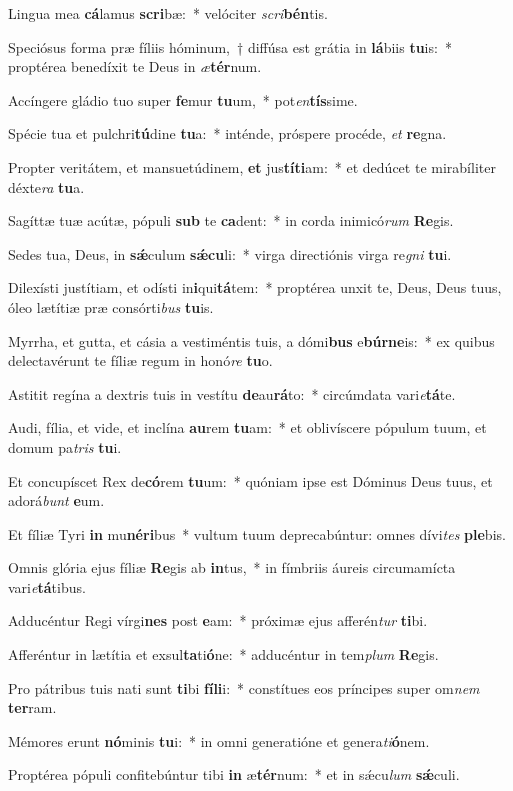 \item Lingua mea \textbf{cá}lamus \textbf{scri}bæ:~* velóciter \textit{scri}\textbf{bén}tis.
\item Speciósus forma præ fíliis hóminum,~† diffúsa est grátia in \textbf{lá}biis \textbf{tu}is:~* proptérea benedíxit te Deus in \textit{æ}\textbf{tér}num.
\item Accíngere gládio tuo super \textbf{fe}mur \textbf{tu}um,~* pot\textit{en}\textbf{tís}sime.
\item Spécie tua et pulchri\textbf{tú}dine \textbf{tu}a:~* inténde, próspere procéde, \textit{et} \textbf{re}gna.
\item Propter veritátem, et mansuetúdinem, \textbf{et} jus\textbf{tí}\textbf{ti}am:~* et dedúcet te mirabíliter déxte\textit{ra} \textbf{tu}a.
\item Sagíttæ tuæ acútæ, pópuli \textbf{sub} te \textbf{ca}dent:~* in corda inimicó\textit{rum} \textbf{Re}gis.
\item Sedes tua, Deus, in \textbf{sǽ}culum \textbf{sǽ}\textbf{cu}li:~* virga directiónis virga re\textit{gni} \textbf{tu}i.
\item Dilexísti justítiam, et odísti in\textbf{i}qui\textbf{tá}tem:~* proptérea unxit te, Deus, Deus tuus, óleo lætítiæ præ consórti\textit{bus} \textbf{tu}is.
\item Myrrha, et gutta, et cásia a vestiméntis tuis, a dómi\textbf{bus} e\textbf{búr}\textbf{ne}is:~* ex quibus delectavérunt te fíliæ regum in honó\textit{re} \textbf{tu}o.
\item Astitit regína a dextris tuis in vestítu \textbf{de}au\textbf{rá}to:~* circúmdata vari\textit{e}\textbf{tá}te.
\item Audi, fília, et vide, et inclína \textbf{au}rem \textbf{tu}am:~* et oblivíscere pópulum tuum, et domum pa\textit{tris} \textbf{tu}i.
\item Et concupíscet Rex de\textbf{có}rem \textbf{tu}um:~* quóniam ipse est Dóminus Deus tuus, et adorá\textit{bunt} \textbf{e}um.
\item Et fíliæ Tyri \textbf{in} mu\textbf{né}\textbf{ri}bus~* vultum tuum deprecabúntur: omnes dívi\textit{tes} \textbf{ple}bis.
\item Omnis glória ejus fíliæ \textbf{Re}gis ab \textbf{in}tus,~* in fímbriis áureis circumamícta vari\textit{e}\textbf{tá}tibus.
\item Adducéntur Regi vírgi\textbf{nes} post \textbf{e}am:~* próximæ ejus afferén\textit{tur} \textbf{ti}bi.
\item Afferéntur in lætítia et exsul\textbf{ta}ti\textbf{ó}ne:~* adducéntur in tem\textit{plum} \textbf{Re}gis.
\item Pro pátribus tuis nati sunt \textbf{ti}bi \textbf{fí}\textbf{li}i:~* constítues eos príncipes super om\textit{nem} \textbf{ter}ram.
\item Mémores erunt \textbf{nó}minis \textbf{tu}i:~* in omni generatióne et genera\textit{ti}\textbf{ó}nem.
\item Proptérea pópuli confitebúntur tibi \textbf{in} æ\textbf{tér}num:~* et in sǽcu\textit{lum} \textbf{sǽ}culi.
